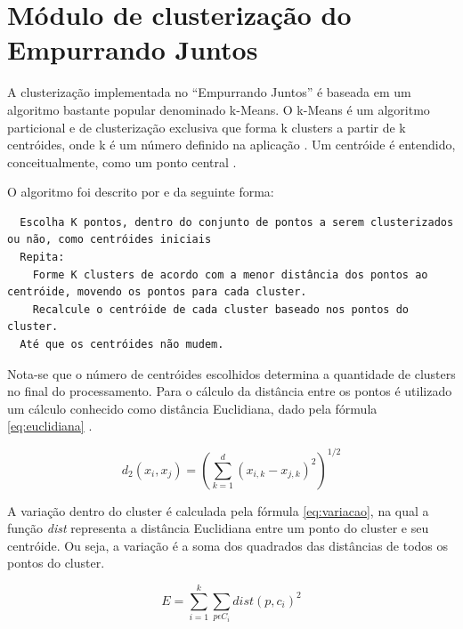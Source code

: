 \section{Módulo de clusterização do Empurrando Juntos}

A clusterização implementada no ``Empurrando Juntos'' é baseada em um algoritmo bastante popular denominado k-Means. O k-Means é um
algoritmo particional e de clusterização exclusiva que forma k clusters a partir de k centróides, onde k é um número definido na aplicação 
\cite{clustering_review, tan2013data}. Um centróide é entendido, conceitualmente, como um ponto central \cite{han2011data}.

O algoritmo foi descrito por  e  da seguinte forma:


\begin{center}
  \lstset{language=HTML, numbers=left, stepnumber=1}
  \begin{lstlisting}
  Escolha K pontos, dentro do conjunto de pontos a serem clusterizados ou não, como centróides iniciais
  Repita:
    Forme K clusters de acordo com a menor distância dos pontos ao centróide, movendo os pontos para cada cluster.
    Recalcule o centróide de cada cluster baseado nos pontos do cluster.
  Até que os centróides não mudem.
  \end{lstlisting}
\end{center}


Nota-se que o número de centróides escolhidos determina a quantidade de clusters no final do processamento.
Para o cálculo da distância entre os pontos é utilizado um cálculo conhecido como distância Euclidiana, 
dado pela fórmula \ref{eq:euclidiana} \cite{clustering_review, tan2013data, han2011data}.

\begin{equation} \label{eq:euclidiana}
  d_{2}(x_i, x_j) = (\sum_{k=1}^{d} (x_{i,k} - x_{j,k})^2)^{1/2}
\end{equation}

A variação dentro do cluster é calculada pela fórmula \ref{eq:variacao}, na qual a 
função \textit{dist} representa a distância Euclidiana entre um ponto do
cluster e seu centróide. Ou seja, a variação é a soma dos quadrados
das distâncias de todos os pontos do cluster.

\begin{equation} \label{eq:variacao}
  E = \sum_{i=1}^{k} \sum_{p \epsilon C_{i}} dist(p, c_i)^2
\end{equation}

